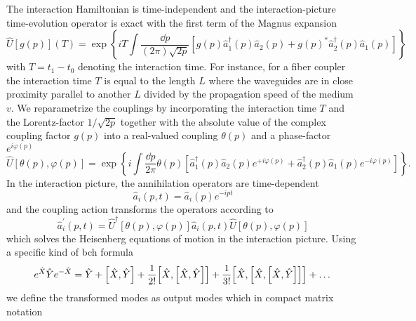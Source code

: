 The interaction Hamiltonian is time-independent and the interaction-picture time-evolution operator is exact with the first term of the Magnus expansion
\begin{equation}
	\hat{U}\left[g(p)\right](T)
	=
	\exp\left\{
		iT
		\int\frac{\dd{p}}{(2\pi)\sqrt{2p}}
		\left[
			g(p)
			\hat{a}_1^\dagger(p)
			\hat{a}_2(p)
			+
			g(p)^*
			\hat{a}_2^\dagger(p)
			\hat{a}_1(p)
		\right]
	\right\}
\end{equation}
with $T=t_1-t_0$ denoting the interaction time.
For instance, for a fiber coupler the interaction time $T$ is equal to the length $L$ where the waveguides are in close proximity parallel to another $L$ divided by the propagation speed of the medium $v$.
We reparametrize the couplings by incorporating the interaction time $T$ and the Lorentz-factor $1/\sqrt{2p}$ together with the absolute value of the complex coupling factor $g(p)$ into a real-valued coupling $\theta(p)$ and a phase-factor $e^{i\varphi(p)}$
\begin{equation}
	\hat{U}\left[\theta(p),\varphi(p)\right]
	=
	\exp\left\{
		i
		\int\frac{\dd{p}}{2\pi}
		\theta(p)
		\left[
			\hat{a}_1^\dagger(p)
			\hat{a}_2(p)
			e^{+i\varphi(p)}
			+
			\hat{a}_2^\dagger(p)
			\hat{a}_1(p)
			e^{-i\varphi(p)}
		\right]
	\right\}
	.
\end{equation}
In the interaction picture, the annihilation operators are time-dependent
\begin{equation}
	\hat{a}_i(p,t)
	=
	\hat{a}_i(p)e^{-ipt}
\end{equation}
and the coupling action transforms the operators according to
\begin{equation}
	\hat{a}_i^\prime(p,t)
	=
	\hat{U}^\dagger\left[\theta(p),\varphi(p)\right]
	\hat{a}_i(p,t)
	\hat{U}\left[\theta(p),\varphi(p)\right]
\end{equation}
which solves the Heisenberg equations of motion in the interaction picture.
Using a specific kind of \gls{bch} formula
\begin{equation}
	e^{\hat{X}}
	\hat{Y}
	e^{-\hat{X}}
	=
	\hat{Y}
	+
	\comm{\hat{X}}{\hat{Y}}
	+
	\frac{1}{2!}
	\comm{\hat{X}}{\comm{\hat{X}}{\hat{Y}}}
	+
	\frac{1}{3!}
	\comm{\hat{X}}{\comm{\hat{X}}{\comm{\hat{X}}{\hat{Y}}}}
	+
	\dots
\end{equation}
we define the transformed modes as output modes which in compact matrix notation
